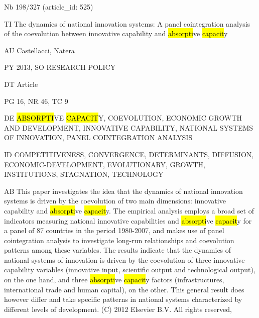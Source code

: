 \documentclass[a4paper]{article}
\begin{document}
\vspace*{-2cm}
Nb \tabto{0cm}198/327 (article\_id: 525)\par
TI \tabto{0cm}The dynamics of national innovation systems: A panel cointegration analysis of the coevolution between innovative capability and \hl{absorpti}ve \hl{capacit}y\par
AU \tabto{0cm}Castellacci, Natera\par
PY \tabto{0cm}2013, SO RESEARCH POLICY\par
DT \tabto{0cm}Article\par
PG \tabto{0cm}16, NR 46, TC 9\par
DE \tabto{0cm}\hl{ABSORPTI}VE \hl{CAPACIT}Y, COEVOLUTION, ECONOMIC GROWTH AND DEVELOPMENT, INNOVATIVE CAPABILITY, NATIONAL SYSTEMS OF INNOVATION, PANEL COINTEGRATION ANALYSIS\par
ID \tabto{0cm}COMPETITIVENESS, CONVERGENCE, DETERMINANTS, DIFFUSION, ECONOMIC-DEVELOPMENT, EVOLUTIONARY, GROWTH, INSTITUTIONS, STAGNATION, TECHNOLOGY\par
AB \tabto{0cm}This paper investigates the idea that the dynamics of national innovation systems is driven by the coevolution of two main dimensions: innovative capability and \hl{absorpti}ve \hl{capacit}y. The empirical analysis employs a broad set of indicators measuring national innovative capabilities and \hl{absorpti}ve \hl{capacit}y for a panel of 87 countries in the period 1980-2007, and makes use of panel cointegration analysis to investigate long-run relationships and coevolution patterns among these variables. The results indicate that the dynamics of national systems of innovation is driven by the coevolution of three innovative capability variables (innovative input, scientific output and technological output), on the one hand, and three \hl{absorpti}ve \hl{capacit}y factors (infrastructures, international trade and human capital), on the other. This general result does however differ and take specific patterns in national systems characterized by different levels of development. (C) 2012 Elsevier B.V. All rights reserved,\par
\clearpage
\end{document}
